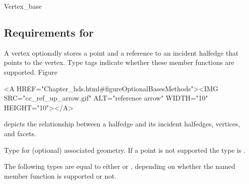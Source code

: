 \begin{ccClass}{Vertex_base}
\subsection{Requirements for \protect{}}
\label{sectionHdsVertexBase}
\ccThreeToTwo


\ccDefinition

A vertex optionally stores a point and a reference to an incident
halfedge that points to the vertex. Type tags indicate whether these
member functions are supported. 
Figure~\ccTexHtml{\ref{figureOptionalBasesMethods}}{}\begin{ccHtmlOnly}
  <A HREF="Chapter_hds.html#figureOptionalBasesMethods"><IMG 
  SRC="cc_ref_up_arrow.gif" ALT="reference arrow" WIDTH="10" HEIGHT="10"></A>
\end{ccHtmlOnly}
depicts the relationship between a halfedge and its incident halfedges,
vertices, and facets.


\ccTypes

Type for (optional) associated geometry. If a
point is not supported the type is .



\ccCreation

\ccGlue
{}
\ccGlue
{}

\ccOperations

\ccGlue
{}
\ccGlue
{}
\ccGlue
{}




The following types are equal to either  or
, depending on whether the named member function is
supported or not.

\ccGlue
{}

\end{ccClass}

